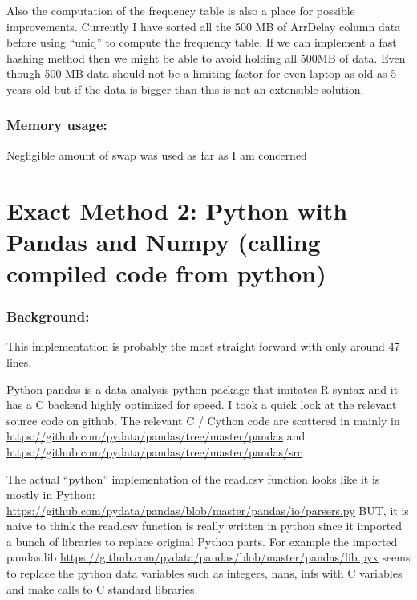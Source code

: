 \documentclass[letterpaper,10pt,english]{/usr/local/lib/python2.7/dist-packages/sphinx/texinputs/sphinxhowto}
\begin{document}
Also the computation of the frequency table is also a place for possible
improvements. Currently I have sorted all the 500 MB of ArrDelay column
data before using ``uniq'' to compute the frequency table. If we can
implement a fast hashing method then we might be able to avoid holding
all 500MB of data. Even though 500 MB data should not be a limiting
factor for even laptop as old as 5 years old but if the data is bigger
than this is not an extensible solution.\section{Memory usage:}Negligible amount of swap was used as far as I am concerned\part{Exact Method 2: Python with Pandas and Numpy (calling compiled code from
python)}\section{Background:}This implementation is probably the most straight forward with only
around 47 lines.

Python pandas is a data analysis python package that imitates R syntax
and it has a C backend highly optimized for speed. I took a quick look
at the relevant source code on github. The relevant C / Cython code are
scattered in mainly in
\url{https://github.com/pydata/pandas/tree/master/pandas} and
\url{https://github.com/pydata/pandas/tree/master/pandas/src}

The actual ``python'' implementation of the read.csv function looks like
it is mostly in Python:
\url{https://github.com/pydata/pandas/blob/master/pandas/io/parsers.py}
BUT, it is naive to think the read.csv function is really written in
python since it imported a bunch of libraries to replace original Python
parts. For example the imported pandas.lib
\url{https://github.com/pydata/pandas/blob/master/pandas/lib.pyx} seems
to replace the python data variables such as integers, nans, infs with C
variables and make calls to C standard libraries.
\end{document}
